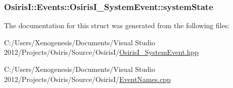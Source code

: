 \hypertarget{struct_osiris_i_1_1_events_1_1_osiris_i___system_event_a7e10c133447ebc42ba7dcec23399b587}{
\subsubsection[{system\-State}]{ Osiris\-I\-::\-Events\-::\-Osiris\-I\-\_\-\-System\-Event\-::system\-State\hspace{0.3cm}{\ttfamily [protected]}}}\label{struct_osiris_i_1_1_events_1_1_osiris_i___system_event_a7e10c133447ebc42ba7dcec23399b587}


The documentation for this struct was generated from the following files\-:\begin{DoxyCompactItemize}
\item 
C\-:/\-Users/\-Xenogenesis/\-Documents/\-Visual Studio 2012/\-Projects/\-Osiris/\-Source/\-Osiris\-I/\hyperlink{_osiris_i___system_event_8hpp}{Osiris\-I\-\_\-\-System\-Event.\-hpp}\item 
C\-:/\-Users/\-Xenogenesis/\-Documents/\-Visual Studio 2012/\-Projects/\-Osiris/\-Source/\-Osiris\-I/\hyperlink{_event_names_8cpp}{Event\-Names.\-cpp}\end{DoxyCompactItemize}
